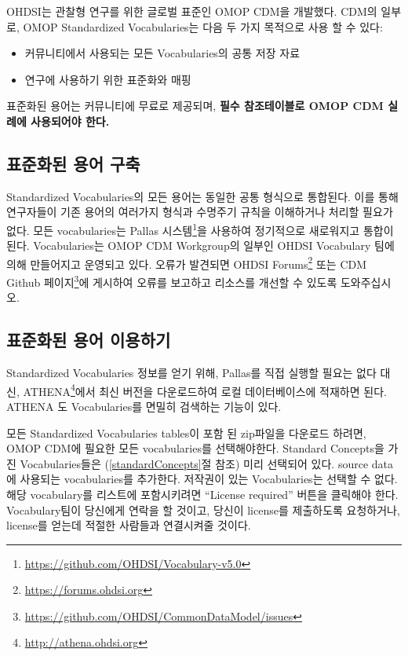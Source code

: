 \documentclass[11pt]{book}
\providecommand{\tightlist}{%
  \setlength{\itemsep}{0pt}\setlength{\parskip}{0pt}}
\let\rmarkdownfootnote\footnote%
\def\footnote{\protect\rmarkdownfootnote}
\theoremstyle{definition}
\theoremstyle{definition}
\theoremstyle{definition}
\theoremstyle{remark}
\begin{document}
OHDSI는 관찰형 연구를 위한 글로벌 표준인 OMOP CDM을 개발했다. CDM의
일부로, OMOP Standardized Vocabularies는 다음 두 가지 목적으로 사용 할
수 있다:

\begin{itemize}
\tightlist
\item
  커뮤니티에서 사용되는 모든 Vocabularies의 공통 저장 자료
\item
  연구에 사용하기 위한 표준화와 매핑
\end{itemize}

표준화된 용어는 커뮤니티에 무료로 제공되며, \textbf{필수 참조테이블로
OMOP CDM 실례에 사용되어야 한다.}

\subsection{표준화된 용어 구축}\label{--}

Standardized Vocabularies의 모든 용어는 동일한 공통 형식으로 통합된다.
이를 통해 연구자들이 기존 용어의 여러가지 형식과 수명주기 규칙을
이해하거나 처리할 필요가 없다. 모든 vocabularies는 Pallas
시스템\footnote{\url{https://github.com/OHDSI/Vocabulary-v5.0}}을
사용하여 정기적으로 새로워지고 통합이 된다. Vocabularies는 OMOP CDM
Workgroup의 일부인 OHDSI Vocabulary 팀에 의해 만들어지고 운영되고 있다.
오류가 발견되면 OHDSI Forums\footnote{\url{https://forums.ohdsi.org}}
또는 CDM Github 페이지\footnote{\url{https://github.com/OHDSI/CommonDataModel/issues}}에
게시하여 오류를 보고하고 리소스를 개선할 수 있도록
도와주십시오.

\subsection{표준화된 용어 이용하기}\label{accessVocabularies}

Standardized Vocabularies 정보를 얻기 위해, Pallas를 직접 실행할 필요는
없다 대신, ATHENA\footnote{\url{http://athena.ohdsi.org}}에서 최신
버전을 다운로드하여 로컬 데이터베이스에 적재하면 된다. ATHENA 도
Vocabularies를 면밀히 검색하는 기능이 있다. 

모든 Standardized Vocabularies tables이 포함 된 zip파일을 다운로드
하려면, OMOP CDM에 필요한 모든 vocabularies를 선택해야한다. Standard
Concepts을 가진 Vocabularies들은 (\ref{standardConcepts}절 참조) 미리
선택되어 있다. source data에 사용되는 vocabularies를 추가한다. 저작권이
있는 Vocabularies는 선택할 수 없다. 해당 vocabulary를 리스트에
포함시키려면 ``License required'' 버튼을 클릭해야 한다. Vocabulary팀이
당신에게 연락을 할 것이고, 당신이 license를 제출하도록 요청하거나,
license를 얻는데 적절한 사람들과 연결시켜줄 것이다.
\end{document}

